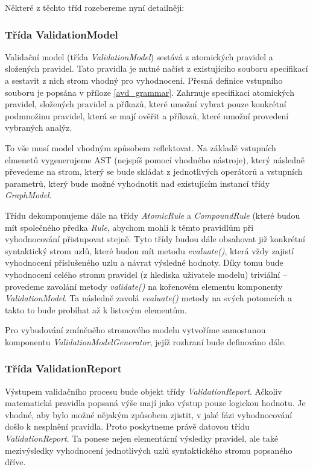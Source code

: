 Některé z těchto tříd rozebereme nyní detailněji:

\subsubsection{Třída ValidationModel}
Validační model (třída \emph{ValidationModel}) sestává z atomických pravidel a složených pravidel. Tato pravidla je nutné načíst z existujícího souboru specifikací a sestavit z nich strom vhodný pro vyhodnocení. Přesná definice vstupního souboru je popsána v příloze \ref{avd_grammar}. Zahrnuje specifikaci atomických pravidel, složených pravidel a příkazů, které umožní vybrat pouze konkrétní podmnožinu pravidel, která se mají ověřit a příkazů, které umožní provedení vybraných analýz.

To vše musí model vhodným způsobem reflektovat. Na základě vstupních elmenetů vygenerujeme AST (nejspíš pomocí vhodného nástroje), který následně převedeme na strom, který se bude skládat z jednotlivých operátorů a vstupních parametrů, který bude možné vyhodnotit nad existujícím instancí třídy \emph{GraphModel}.

Třídu dekomponujeme dále na třídy \emph{AtomicRule} a \emph{CompoundRule} (které budou mít společného předka \emph{Rule}, abychom mohli k těmto pravidlům při vyhodnocování přistupovat stejně. Tyto třídy budou dále obsahovat již konkrétní syntaktický strom uzlů, které budou mít metodu \emph{evaluate()}, která vždy zajistí vyhodnocení příslušeného uzlu a návrat výsledné hodnoty. Díky tomu bude vyhodnocení celého stromu pravidel (z hlediska uživatele modelu) triviální -- provedeme zavolání metody \emph{validate()} na kořenovém elementu komponenty \emph{ValidationModel}. Ta následně zavolá \emph{evaluate()} metody na svých potomcích a takto to bude probíhat až k listovým elementům.

Pro vybudování zmíněného stromového modelu vytvoříme samostanou komponentu \emph{ValidationModelGenerator}, jejíž rozhraní bude definováno dále.

\subsubsection{Třída ValidationReport}
\label{design-class_validation_report}
Výstupem validačního procesu bude objekt třídy \emph{ValidationReport}. Ačkoliv matematická pravidla popsaná výše mají jako výstup pouze logickou hodnotu. Je vhodné, aby bylo možné nějakým způsobem zjistit, v jaké fázi vyhodnocování došlo k nesplnění pravidla. Proto poskytneme právě datovou třídu \emph{ValidationReport}. Ta ponese nejen elementární výsledky pravidel, ale také mezivýsledky vyhodnocení jednotlivých uzlů syntaktického stromu popsaného dříve.

